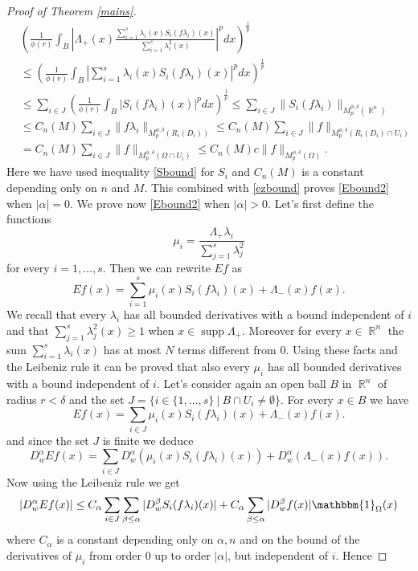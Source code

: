\documentclass[12pt]{article}
\theoremstyle{definition}
\DeclareMathOperator\supp{supp}
\DeclareMathOperator\rr{\mathbb{R}}
\begin{document}
\begin{proof}[Proof of Theorem \ref{mains}]
\begin{align*}
&\left( \frac{1}{\phi(r)} \int_B \left|\Lambda_+(x) \frac{\sum_{i=1}^s \lambda_i(x)S_i(f\lambda_i)(x)}{\sum_{i=1}^s \lambda_i^2(x)}\right|^pdx \right)^\frac{1}{p} \\
&\le   \left( \frac{1}{\phi(r)} \int_{B}|\sum_{i=1}^s \lambda_i(x)S_i(f\lambda_i)(x)|^pdx \right)^\frac{1}{p} \\
& \le  \sum_{i\in J}  \left( \frac{1}{\phi(r)} \int_{B} |S_i(f\lambda_i)(x)|^pdx \right)^\frac{1}{p} \le \sum_{i\in J} \| S_i(f\lambda_i)\|_{M_p^{\phi,\delta}(\rr^n)} \\
& \le C_n(M) \sum_{i\in J} \| f\lambda_i\|_{M_p^{\phi,\delta}(R_i(D_i))} \le C_n(M) \sum_{i\in J} \| f\|_{M_p^{\phi,\delta}(R_i(D_i)\cap U_i)}\\
&= C_n(M)\sum_{i\in J} \| f\|_{M_p^{\phi,\delta}(\Omega \cap U_i)} \le C_n(M) c\| f\|_{M_p^{\phi,\delta}(\Omega )}.
\end{align*}
Here we have used inequality \eqref{Sbound} for $S_i$ and $C_n(M)$ is a constant depending only on $n$ and $M$. This combined with \eqref{ezbound} proves \eqref{Ebound2} when $|\alpha|=0.$ We prove now \eqref{Ebound2} when $|\alpha|>0.$ Let's first define the functions
\[ \mu_i=\frac{\Lambda_+\lambda_i}{\sum_{j=1}^s\lambda^2_j}\]
for every $i=1,...,s.$ Then we can rewrite $Ef$ as
\[ Ef(x)=\sum_{i=1}^s \mu_i(x)S_i(f\lambda_i)(x)+\Lambda_-(x)f(x).\]
We recall that every $\lambda_i$ has all bounded derivatives with a bound independent of $i$ and that $\sum_{j=1}^s\lambda^2_j(x)\ge 1$ when $x \in \supp \Lambda_+.$ Moreover for every $x\in \rr^n$ the sum $\sum_{i=1}^s\lambda_i(x)$ has at most $N$ terms different from $0$. Using these facts and the Leibeniz rule it can be proved that also every $\mu_i$ has all bounded derivatives with a bound independent of $i$. Let's consider again an open ball $B$ in $\rr^n$ of radius $r<\delta$ and the set $J=\{i \in \{1,...,s\} \ | \ B\cap U_i \neq \emptyset\}$. For every $x \in B$ we have
\[ Ef(x)=\sum_{i \in J} \mu_i(x)S_i(f\lambda_i)(x)+\Lambda_-(x)f(x).\]
and since the set $J$ is finite we deduce
\[ D^\alpha_wEf(x)=\sum_{i \in J} D^\alpha_w(\mu_i(x)S_i(f\lambda_i)(x))+D^\alpha_w(\Lambda_-(x)f(x)).\]
Now using the Leibeniz rule we get
\[ |D^\alpha_wEf(x)|\le C_\alpha\sum_{i \in J} \sum_{\beta\le \alpha} |D^\beta_wS_i(f\lambda_i)(x)|+C_\alpha\sum_{\beta\le \alpha} |D^\beta_w f(x)|\mathbbm{1}_\Omega(x)\]
where $C_\alpha$ is a constant depending only on $\alpha,n$ and on the bound of the derivatives of $\mu_i$ from order 0 up to order $|\alpha|$, but independent of $i.$ Hence 

\end{proof}
\end{document}
